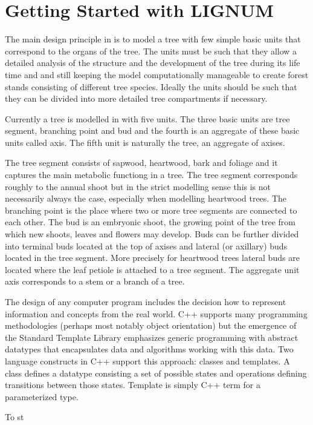 \section{Getting Started with LIGNUM}

The  main design  principle in  \lignum is  to model  a tree  with few
simple  basic units that  correspond to  the organs  of the  tree. The
units  must  be  such that  they  allow  a  detailed analysis  of  the
structure and the development of the tree during its life time and and
still keeping  the model  computationally manageable to  create forest
stands consisting of different  tree species. Ideally the units should
be such that they can  be divided into more detailed tree compartments
if necessary.

Currently a  tree is modelled in  \lignum with five  units.  The three
basic units are  tree segment, branching point and  bud and the fourth
is an  aggregate of these basic  units called axis. The  fifth unit is
naturally the tree, an aggregate of axises.

The tree segment consists of  sapwood, heartwood, bark and foliage and
it captures the main metabolic  functiong in a tree.  The tree segment
corresponds roughly  to the annual  shoot but in the  strict modelling
sense  this  is  not  necessarily  always the  case,  especially  when
modelling heartwood trees.  The branching point is the place where two
or more  tree segments  are connected  to each other.   The bud  is an
embryonic shoot, the growing point  of the tree from which new shoots,
leaves  and flowers  may develop.   Buds can  be further  divided into
terminal buds located  at the top of axises  and lateral (or axillary)
buds located in the tree  segment.  More precisely for heartwood trees
lateral buds are located where the  leaf petiole is attached to a tree
segment. The aggregate unit axis corresponds  to a stem or a branch of
a tree.

The  design of  any  computer  program includes  the  decision how  to
represent information  and concepts from the real  world. C++ supports
many   programming   methodologies   (perhaps  most   notably   object
orientation)  but  the  emergence  of the  Standard  Template  Library
emphasizes   generic   programming   with  abstract   datatypes   that
encapsulates data and algorithms  working with this data. Two language
constructs  in C++  support this  approach: classes  and  templates. A
class  defines a  datatype consisting  a  set of  possible states  and
operations  defining  transitions between  those  states. Template  is
simply C++ term for a parameterized type.

To st


